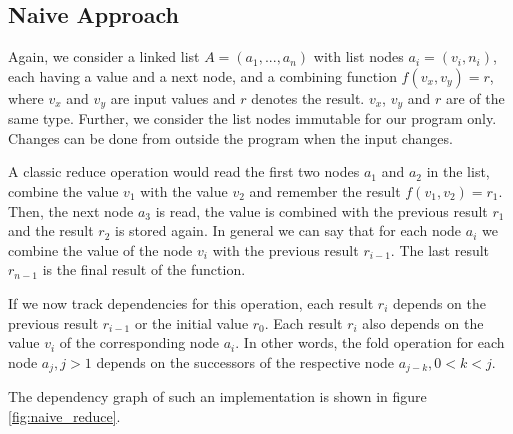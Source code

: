 \subsection{Naive Approach}

Again, we consider a linked list $A = (a_1, ..., a_n)$ with list nodes $a_i = (v_i, n_i)$, each having a value and a next node, and a combining function $f(v_x, v_y) = r$, where $v_x$ and $v_y$ are input values and $r$ denotes the result. $v_x$, $v_y$ and $r$ are of the same type. Further, we consider the list nodes immutable for our program only. Changes can be done from outside the program when the input changes.

A classic reduce operation would read the first two nodes $a_1$ and $a_2$ in the list, combine the value $v_1$ with the value $v_2$ and remember the result $f(v_1, v_2) = r_1$. Then, the next node $a_3$ is read, the value is combined with the previous result $r_1$ and the result $r_2$ is stored again. In general we can say that for each node $a_i$ we combine the value of the node $v_i$ with the previous result $r_{i-1}$. The last result $r_{n-1}$ is the final result of the function. 

If we now track dependencies for this operation, each result $r_i$ depends on the previous result $r_{i - 1}$ or the initial value $r_0$. Each result $r_i$ also depends on the value $v_i$ of the corresponding node $a_i$. In other words, the fold operation for each node $a_j, j > 1$ depends on the successors of the respective node $a_{j - k}, 0 < k < j$.

The dependency graph of such an implementation is shown in figure \ref{fig:naive_reduce}. 

